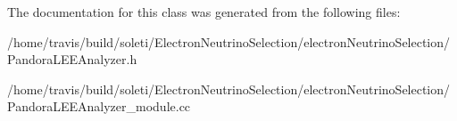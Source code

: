The documentation for this class was generated from the following files\-:\begin{DoxyCompactItemize}
\item 
/home/travis/build/soleti/\-Electron\-Neutrino\-Selection/electron\-Neutrino\-Selection/Pandora\-L\-E\-E\-Analyzer.\-h\item 
/home/travis/build/soleti/\-Electron\-Neutrino\-Selection/electron\-Neutrino\-Selection/Pandora\-L\-E\-E\-Analyzer\-\_\-module.\-cc\end{DoxyCompactItemize}
